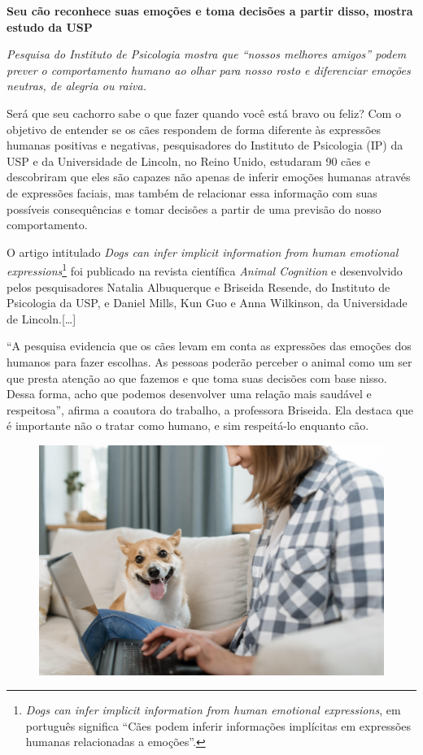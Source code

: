\begin{myquote}
\begin{center}
\noindent\textbf{Seu cão reconhece suas emoções e toma decisões a partir disso, mostra estudo da USP}

\noindent \small{\emph{Pesquisa do Instituto de Psicologia mostra que ``nossos melhores
amigos'' podem prever o comportamento humano ao olhar para nosso rosto e
diferenciar emoções neutras, de alegria ou raiva.}}
\end{center}
\medskip

\noindent Será que seu cachorro sabe o que fazer quando você está bravo ou feliz?
Com o objetivo de entender se os cães respondem de forma diferente às
expressões humanas positivas e negativas, pesquisadores do Instituto de
Psicologia (IP) da USP e da Universidade de Lincoln, no Reino Unido,
estudaram 90 cães e descobriram que eles são capazes não apenas de
inferir emoções humanas através de expressões faciais, mas também de
relacionar essa informação com suas possíveis consequências e tomar
decisões a partir de uma previsão do nosso comportamento.

O artigo intitulado \emph{Dogs can infer implicit information from human
emotional expressions}\footnote{\emph{Dogs can infer implicit information from human emotional
  expressions}, em português significa ``Cães podem inferir informações
  implícitas em expressões humanas relacionadas a emoções''.} 
foi publicado na
 revista científica \emph{Animal Cognition} e desenvolvido pelos
 pesquisadores Natalia Albuquerque e Briseida Resende, do Instituto de
 Psicologia da USP, e Daniel Mills, Kun Guo e Anna Wilkinson, da Universidade
 de Lincoln.{[}\ldots{}{]}

``A pesquisa evidencia que os cães levam em conta as expressões das
emoções dos humanos para fazer escolhas. As pessoas poderão perceber o
animal como um ser que presta atenção ao que fazemos e que toma suas
decisões com base nisso. Dessa forma, acho que podemos desenvolver uma
relação mais saudável e respeitosa'', afirma a coautora do trabalho, a
professora Briseida. Ela destaca que é importante não o tratar como
humano, e sim respeitá-lo enquanto cão.
\begin{figure}[H]
\centering\includegraphics[width=\textwidth]{./imgSAEB_6_POR/freepik/PORT_6_IMG-8.jpeg}
\end{figure}


\end{myquote}
